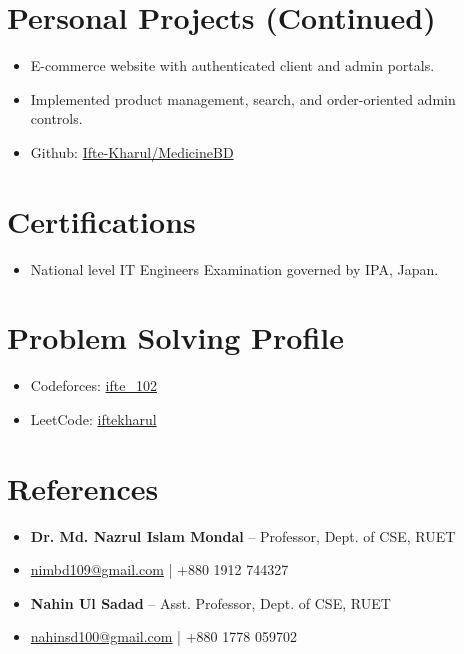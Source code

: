 \documentclass[]{plushcv}
\begin{document}
\begin{minipage}[t]{0.6\textwidth}

\section{Personal Projects (Continued)}

\begin{itemize}[leftmargin=*,noitemsep,topsep=2pt]
\item E-commerce website with authenticated client and admin portals.
\item Implemented product management, search, and order-oriented admin controls.
\item Github: \href{https://github.com/Ifte-Kharul/MedicineBD}{Ifte-Kharul/MedicineBD}
\end{itemize}

\section{Certifications}
\begin{itemize}[leftmargin=*,noitemsep,topsep=2pt]
\item National level IT Engineers Examination governed by IPA, Japan.
\end{itemize}

\section{Problem Solving Profile}
\begin{itemize}[leftmargin=*,noitemsep,topsep=2pt]
\item Codeforces: \href{https://codeforces.com/profile/ifte_102}{ifte\_102}
\item LeetCode: \href{https://leetcode.com/u/iftekharul/}{iftekharul}
\end{itemize}

\end{minipage}
\hfill
\begin{minipage}[t]{0.4\textwidth}

\section{References}
\begin{itemize}[leftmargin=*,noitemsep,topsep=2pt]
\item \textbf{Dr. Md. Nazrul Islam Mondal} -- Professor, Dept. of CSE, RUET
\item \href{mailto:nimbd109@gmail.com}{nimbd109@gmail.com} | +880 1912 744327
\item \textbf{Nahin Ul Sadad} -- Asst. Professor, Dept. of CSE, RUET
\item \href{mailto:nahinsd100@gmail.com}{nahinsd100@gmail.com} | +880 1778 059702
\end{itemize}

\end{minipage}
\end{document}
